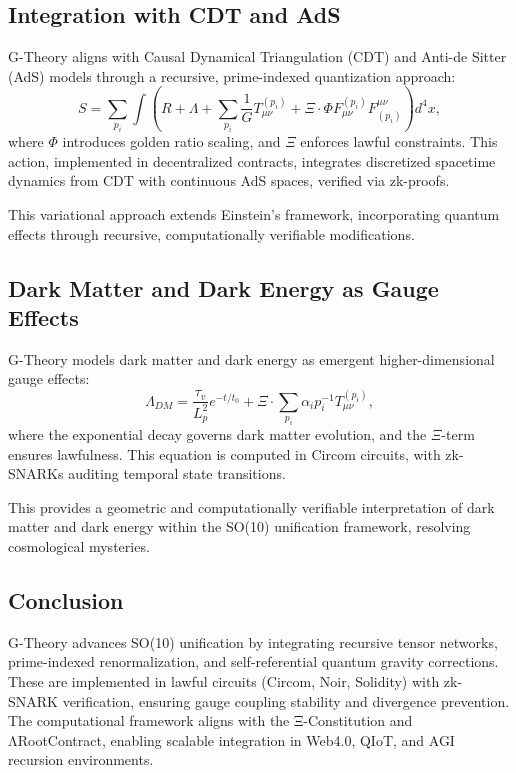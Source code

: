 \documentclass{article}
\theoremstyle{plain}
\begin{document}
\subsection{Integration with CDT and AdS}
G-Theory aligns with Causal Dynamical Triangulation (CDT) and Anti-de Sitter (AdS) models through a recursive, prime-indexed quantization approach:
\begin{equation}
    S = \sum_{p_i} \int \left( R + \Lambda + \sum_{p_i} \frac{1}{G} T_{\mu\nu}^{(p_i)} + \Xi \cdot \Phi F_{\mu\nu}^{(p_i)} F^{\mu\nu}_{(p_i)} \right) d^4x,
\end{equation}
where $\Phi$ introduces golden ratio scaling, and $\Xi$ enforces lawful constraints. This action, implemented in decentralized contracts, integrates discretized spacetime dynamics from CDT with continuous AdS spaces, verified via zk-proofs.

This variational approach extends Einstein’s framework, incorporating quantum effects through recursive, computationally verifiable modifications.

\subsection{Dark Matter and Dark Energy as Gauge Effects}
G-Theory models dark matter and dark energy as emergent higher-dimensional gauge effects:
\begin{equation}
    \Lambda_{DM} = \frac{\tau_v}{L_p^2} e^{-t/t_0} + \Xi \cdot \sum_{p_i} \alpha_i p_i^{-1} T_{\mu\nu}^{(p_i)},
\end{equation}
where the exponential decay governs dark matter evolution, and the $\Xi$-term ensures lawfulness. This equation is computed in Circom circuits, with zk-SNARKs auditing temporal state transitions.

This provides a geometric and computationally verifiable interpretation of dark matter and dark energy within the SO(10) unification framework, resolving cosmological mysteries.

\subsection{Conclusion}
G-Theory advances SO(10) unification by integrating recursive tensor networks, prime-indexed renormalization, and self-referential quantum gravity corrections. These are implemented in lawful circuits (Circom, Noir, Solidity) with zk-SNARK verification, ensuring gauge coupling stability and divergence prevention. The computational framework aligns with the Ξ-Constitution and ΛRootContract, enabling scalable integration in Web4.0, QIoT, and AGI recursion environments.
\end{document}
